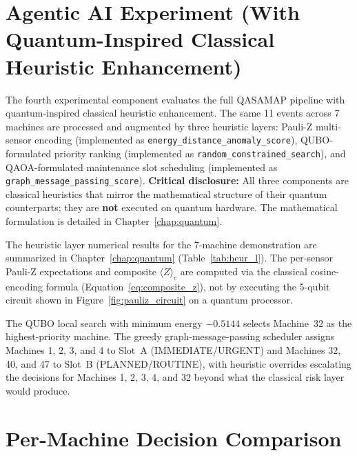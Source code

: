 \section{Agentic AI Experiment (With Quantum-Inspired Classical Heuristic Enhancement)}

The fourth experimental component evaluates the full QASAMAP pipeline with quantum-inspired classical heuristic enhancement. The same 11 events across 7 machines are processed and augmented by three heuristic layers: Pauli-Z multi-sensor encoding (implemented as \texttt{energy\_distance\_anomaly\_score}), QUBO-formulated priority ranking (implemented as \texttt{random\_constrained\_search}), and QAOA-formulated maintenance slot scheduling (implemented as \texttt{graph\_message\_passing\_score}). \textbf{Critical disclosure:} All three components are classical heuristics that mirror the mathematical structure of their quantum counterparts; they are \textbf{not} executed on quantum hardware. The mathematical formulation is detailed in Chapter~\ref{chap:quantum}.

The heuristic layer numerical results for the 7-machine demonstration are summarized in Chapter~\ref{chap:quantum} (Table~\ref{tab:heur_l}). The per-sensor Pauli-Z expectations and composite $\langle Z \rangle_c$ are computed via the classical cosine-encoding formula (Equation~\ref{eq:composite_z}), not by executing the 5-qubit circuit shown in Figure~\ref{fig:pauliz_circuit} on a quantum processor.

The QUBO local search with minimum energy $-0.5144$ selects Machine~32 as the highest-priority machine. The greedy graph-message-passing scheduler assigns Machines 1, 2, 3, and 4 to Slot~A (IMMEDIATE/URGENT) and Machines 32, 40, and 47 to Slot~B (PLANNED/ROUTINE), with heuristic overrides escalating the decisions for Machines 1, 2, 3, 4, and 32 beyond what the classical risk layer would produce.

\section{Per-Machine Decision Comparison}

